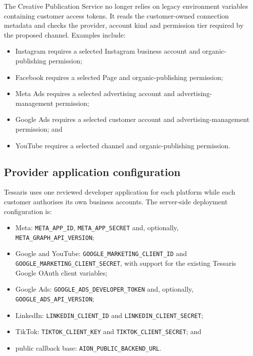 The Creative Publication Service no longer relies on legacy environment variables containing customer access tokens. It reads the customer-owned connection metadata and checks the provider, account kind and permission tier required by the proposed channel. Examples include:

\begin{itemize}
    \item Instagram requires a selected Instagram business account and organic-publishing permission;
    \item Facebook requires a selected Page and organic-publishing permission;
    \item Meta Ads requires a selected advertising account and advertising-management permission;
    \item Google Ads requires a selected customer account and advertising-management permission; and
    \item YouTube requires a selected channel and organic-publishing permission.
\end{itemize}

\subsection{Provider application configuration}

Tessaris uses one reviewed developer application for each platform while each customer authorises its own business accounts. The server-side deployment configuration is:

\begin{itemize}
    \item Meta: \texttt{META\_APP\_ID}, \texttt{META\_APP\_SECRET} and, optionally, \texttt{META\_GRAPH\_API\_VERSION};
    \item Google and YouTube: \texttt{GOOGLE\_MARKETING\_CLIENT\_ID} and \texttt{GOOGLE\_MARKETING\_CLIENT\_SECRET}, with support for the existing Tessaris Google OAuth client variables;
    \item Google Ads: \texttt{GOOGLE\_ADS\_DEVELOPER\_TOKEN} and, optionally, \texttt{GOOGLE\_ADS\_API\_VERSION};
    \item LinkedIn: \texttt{LINKEDIN\_CLIENT\_ID} and \texttt{LINKEDIN\_CLIENT\_SECRET};
    \item TikTok: \texttt{TIKTOK\_CLIENT\_KEY} and \texttt{TIKTOK\_CLIENT\_SECRET}; and
    \item public callback base: \texttt{AION\_PUBLIC\_BACKEND\_URL}.
\end{itemize}

